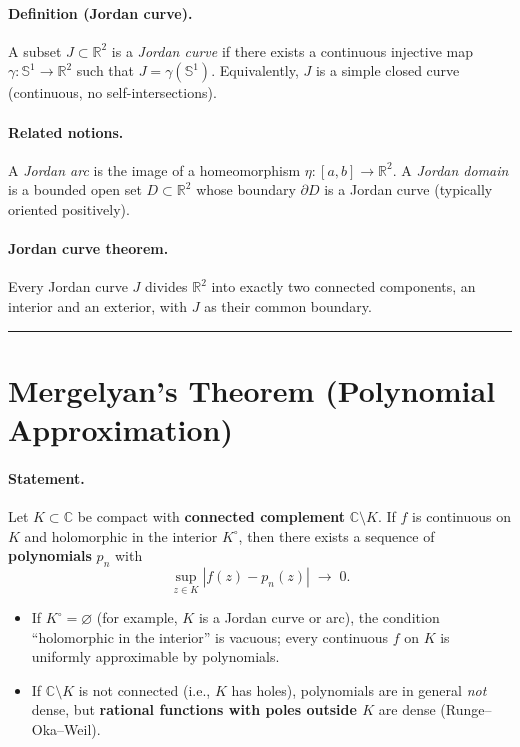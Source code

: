 \documentclass[12pt,a4paper]{article}
\theoremstyle{plain}
\theoremstyle{definition}
\theoremstyle{remark}
\theoremstyle{remark}
\begin{document}
\paragraph{Definition (Jordan curve).}
A subset $J\subset \mathbb{R}^2$ is a \emph{Jordan curve} if there exists a continuous
injective map $\gamma:\mathbb{S}^1\to\mathbb{R}^2$ such that $J=\gamma(\mathbb{S}^1)$.
Equivalently, $J$ is a simple closed curve (continuous, no self-intersections).

\paragraph{Related notions.}
A \emph{Jordan arc} is the image of a homeomorphism $\eta:[a,b]\to\mathbb{R}^2$.
A \emph{Jordan domain} is a bounded open set $D\subset\mathbb{R}^2$ whose boundary
$\partial D$ is a Jordan curve (typically oriented positively).

\paragraph{Jordan curve theorem.}
Every Jordan curve $J$ divides $\mathbb{R}^2$ into exactly two connected components,
an interior and an exterior, with $J$ as their common boundary.
	
\noindent\rule{\textwidth}{0.4pt}		
	
\section*{Mergelyan's Theorem (Polynomial Approximation)}

\paragraph{Statement.}
Let $K\subset\mathbb{C}$ be compact with \textbf{connected complement} $\mathbb{C}\setminus K$.
If $f$ is continuous on $K$ and holomorphic in the interior $K^\circ$, then there exists
a sequence of \textbf{polynomials} $p_n$ with
\[
\sup_{z\in K} |f(z)-p_n(z)| \;\longrightarrow\; 0.
\]
\begin{itemize}
	\item If $K^\circ=\varnothing$ (for example, $K$ is a Jordan curve or arc),
	the condition “holomorphic in the interior” is vacuous; every continuous $f$ on $K$
	is uniformly approximable by polynomials.
	\item If $\mathbb{C}\setminus K$ is not connected (i.e., $K$ has holes),
	polynomials are in general \emph{not} dense, but \textbf{rational functions with poles outside $K$}
	are dense (Runge--Oka--Weil).
\end{itemize}
\end{document}
